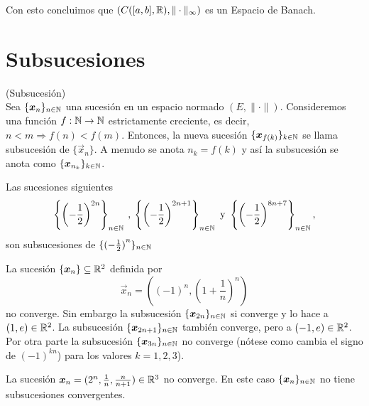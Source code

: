 Con esto concluimos que $(C([a,b],\mathbb{R}),\|\cdot\|_\infty)$ es un Espacio de Banach.

\section{Subsucesiones}

\begin{definicion}{\rm (Subsucesi\'on)}
\\Sea $\{\boldsymbol{x}_n\}_{n\in\mathbb{N}}$ una sucesi\'on en un espacio normado $(E,\|\cdot\|)$. Consideremos una funci\'on $f:\mathbb{N}\to\mathbb{N}$ estrictamente creciente, es decir, $n<m\Rightarrow f(n)<f(m)$. Entonces, la nueva sucesi\'on $\{\boldsymbol{x}_{f(k)}\}_{k\in\mathbb{N}}$ se llama subsucesi\'on de $\{\vec{x}_n\}$. A menudo se anota $n_k=f(k)$ y as\'i la subsucesi\'on se anota como $\{\boldsymbol{x}_{n_k}\}_{k\in\mathbb{N}}$.
\end{definicion}

\begin{ejemplo}
Las sucesiones siguientes
$$\left\{\left(-\frac{1}{2}\right)^{2n}\right\}_{n\in\mathbb{N}} \:,\:
\left\{\left(-\frac{1}{2}\right)^{2n+1}\right\}_{n\in\mathbb{N}}\text{ y }
\left\{\left(-\frac{1}{2}\right)^{8n+7}\right\}_{n\in\mathbb{N}},
$$
son subsucesiones de
$\{{(-\frac{1}{2})}^{n}\}_{n\in\mathbb{N}}$
\end{ejemplo}

\begin{ejemplo}
La sucesi\'on $\{\boldsymbol{x}_n\}\subseteq \mathbb{R}^2$ definida por
$$\vec{x}_n=\left((-1)^n,\left(1+\frac{1}{n}\right)^n\right)$$ 
no converge. Sin embargo la subsucesi\'on $\{\boldsymbol{x}_{2n}\}_{n\in\mathbb{N}}$ si converge y lo hace a $(1,e)\in \mathbb{R}^2$. La subsucesi\'on $\{\boldsymbol{x}_{2n+1}\}_{n\in\mathbb{N}}$
tambi\'en converge, pero a $(-1,e)\in \mathbb{R}^2$. Por otra parte la subsucesi\'on $\{\boldsymbol{x}_{3n}\}_{n\in\mathbb{N}}$ no converge (n\'otese como cambia el signo de $(-1)^{kn}$) para los valores $k=1,2,3$).
\end{ejemplo}

\begin{ejemplo}
La sucesi\'on $\boldsymbol{x}_n=(2^n,\frac{1}{n},\frac{n}{n+1})\in \mathbb{R}^3$ no converge. En este caso $\{\boldsymbol{x}_n\}_{n\in\mathbb{N}}$ no tiene subsucesiones convergentes.
\end{ejemplo}

